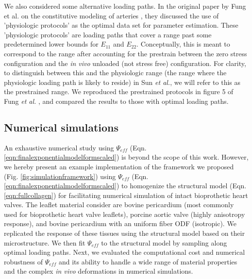     We also considered some alternative loading paths. In the original paper by Fung et al. on the constitutive modeling of arteries \cite{fung_pseudoelasticity_1979}, they discussed the use of 'physiologic protocols' as the optimal data set for parameter estimation. These 'physiologic protocols' are loading paths that cover a range past some predetermined lower bounds for $E_{11}$ and $E_{22}$. Conceptually, this is meant to correspond to the range after accounting for the prestrain between the zero stress configuration and the \textit{in vivo} unloaded (not stress free) configuration. For clarity, to distinguish between this and the physiologic range (the range where the physiologic loading path is likely to reside) in Sun \textit{et al.}, we will refer to this as the prestrained range. We reproduced the prestrained protocols in figure 5 of Fung \textit{et al.} \cite{fung_pseudoelasticity_1979}, and compared the results to those with optimal loading paths. 





\subsection{Numerical simulations}

	An exhaustive numerical study using $\Psi_{eff}$ (Eqn. \ref{eqn:finalexponentialmodelformscaled}) is beyond the scope of this work. However, we hereby present an example implementation of the framework we proposed (Fig. \ref{fig:simulationframework}) using $\Psi_{eff}$ (Eqn. \ref{eqn:finalexponentialmodelformscaled}) to homogenize the structural model (Eqn. \ref{eqn:fullcollagen}) for facilitating numerical simulation of intact bioprothetic heart valves. The leaflet material consider are bovine pericardium (most commonly used for bioprothetic heart valve leaflets), porcine aortic valve (highly anisotropy response), and bovine pericardium with an uniform fiber ODF (isotropic). We replicated the response of these tissues using the structural model based on their microstructure. We then fit $\Psi_{eff}$ to the structural model by sampling along optimal loading paths. Next, we evaluated the computational cost and numerical robustness of $\Psi_{eff}$ and its ability to handle a wide range of material properties and the complex \textit{in vivo} deformations in numerical simulations.
    
